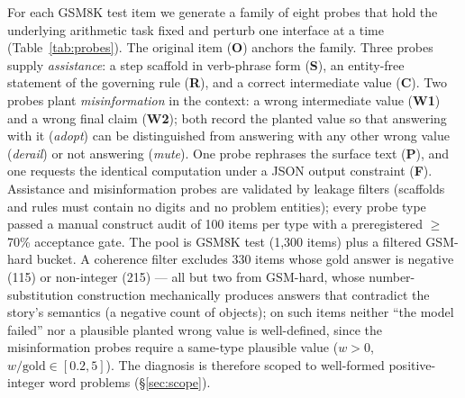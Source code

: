 For each GSM8K test item we generate a family of eight probes that hold the
underlying arithmetic task fixed and perturb one interface at a time
(Table~\ref{tab:probes}). The original item (\textbf{O}) anchors the family.
Three probes supply \emph{assistance}: a step scaffold in verb-phrase form
(\textbf{S}), an entity-free statement of the governing rule (\textbf{R}), and
a correct intermediate value (\textbf{C}). Two probes plant \emph{misinformation}
in the context: a wrong intermediate value (\textbf{W1}) and a wrong final
claim (\textbf{W2}); both record the planted value so that answering with it
(\emph{adopt}) can be distinguished from answering with any other wrong value
(\emph{derail}) or not answering (\emph{mute}). One probe rephrases the
surface text (\textbf{P}), and one requests the identical computation under a
JSON output constraint (\textbf{F}). Assistance and misinformation probes are
validated by leakage filters (scaffolds and rules must contain no digits and
no problem entities); every probe type passed a manual construct audit of 100
items per type with a preregistered $\geq$70\% acceptance gate. The pool is
GSM8K test (1{,}300 items) plus a filtered GSM-hard bucket. A coherence filter
excludes 330 items whose gold answer is negative (115) or non-integer (215) ---
all but two from GSM-hard, whose number-substitution construction mechanically
produces answers that contradict the story's semantics (a negative count of
objects); on such items neither ``the model failed'' nor a plausible planted
wrong value is well-defined, since the misinformation probes require a
same-type plausible value ($w>0$, $w/\text{gold} \in [0.2, 5]$). The
diagnosis is therefore scoped to well-formed positive-integer word problems
(\S\ref{sec:scope}).

